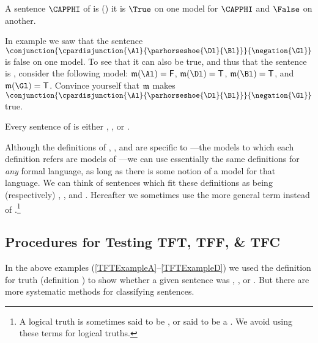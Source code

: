 \begin{majorILnc}{}
A sentence $\CAPPHI$ of \GSL{} is  () \Iff it is $\True$ on one model for $\CAPPHI$ and $\False$ on another. 
\end{majorILnc}

\begin{majorILnc}{}
In example  we saw that the sentence $\conjunction{\cpardisjunction{\Al}{\parhorseshoe{\Dl}{\Bl}}}{\negation{\Gl}}$ is false on one model.
To see that it can also be true, and thus that the sentence is , consider the following model: $\IntA(\Al)=\FalseB$, $\IntA(\Dl)=\TrueB$, $\IntA(\Bl)=\TrueB$, and $\IntA(\Gl)=\TrueB$.
Convince yourself that $\mathfrak{m}$ makes $\conjunction{\cpardisjunction{\Al}{\parhorseshoe{\Dl}{\Bl}}}{\negation{\Gl}}$ true. 
\end{majorILnc}

\noindent{}Every sentence of \GSL{} is either , , or .

Although the definitions of , , and  are specific to \GSL{}---the models to which each definition refers are models of \GSL{}---we can use essentially the same definitions for \emph{any} formal language, as long as there is some notion of a model for that language. 
We can think of sentences which fit these definitions as being (respectively) , , and . Hereafter we sometimes use the more general term  instead of .\footnote{
	A logical truth is sometimes said to be , or said to be a . 
	We avoid using these terms for logical truths.
}

\subsection{Procedures for Testing TFT, TFF, \& TFC}\label{Proceduresfortesting}

In the above examples (\ref{TFTExampleA}--\ref{TFTExampleD}) we used the definition for truth (definition ) to show whether a given \GSL{} sentence was , , or . 
But there are more systematic methods for classifying \GSL{} sentences. 

